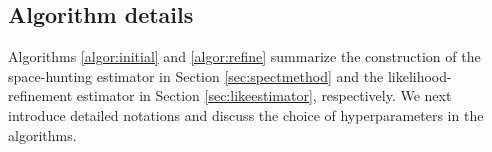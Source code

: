 \documentclass[12pt]{article}
\newcommand{\EXPT}{\mathbb{E}}
\newcommand{\ksum}{k_{\operatorname{sum}}}
\begin{document}



\subsection{Algorithm details} %
\label{sec:algodetail}

Algorithms  \ref{algor:initial} and \ref{algor:refine} summarize the construction of the space-hunting estimator in Section  \ref{sec:spectmethod}  and the likelihood-refinement estimator in Section \ref{sec:likeestimator}, respectively.  
We next introduce detailed notations and discuss the choice of  hyperparameters in the  algorithms. 
\end{document}
